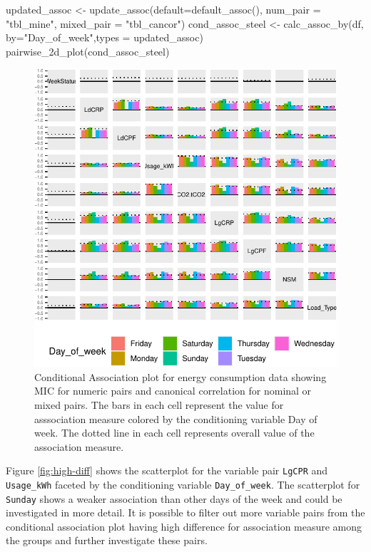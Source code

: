 \begin{Schunk}
\begin{Sinput}
updated_assoc <- update_assoc(default=default_assoc(),
                              num_pair = "tbl_mine",
                              mixed_pair = "tbl_cancor")
cond_assoc_steel <- calc_assoc_by(df, by="Day_of_week",types = updated_assoc)
pairwise_2d_plot(cond_assoc_steel)
\end{Sinput}
\begin{figure}

{\centering \includegraphics{rj_paper_files/figure-latex/cond-assoc-1} 

}

\caption[Conditional Association plot for energy consumption data showing MIC for numeric pairs and canonical correlation for nominal or mixed pairs]{Conditional Association plot for energy consumption data showing MIC for numeric pairs and canonical correlation for nominal or mixed pairs. The bars in each cell represent the value for asssociation measure colored by the conditioning variable Day of week. The dotted line in each cell represents overall value of the association measure.}\label{fig:cond-assoc}
\end{figure}
\end{Schunk}

Figure \ref{fig:high-diff} shows the scatterplot for the variable pair
\texttt{LgCPR} and \texttt{Usage\_kWh} faceted by the conditioning
variable \texttt{Day\_of\_week}. The scatterplot for \texttt{Sunday}
shows a weaker association than other days of the week and could be
investigated in more detail. It is possible to filter out more variable
pairs from the conditional association plot having high difference for
association measure among the groups and further investigate these
pairs.

